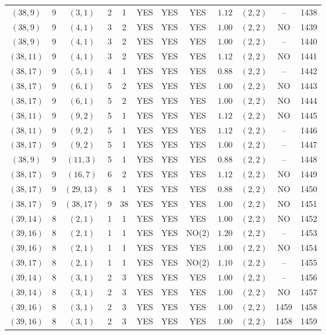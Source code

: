 \begin{longtable}{|c|c|c|c|c|c|c|c|c|c|c|c|}
$(38,9)$ & 9 & $(3,1)$ & 2 & 1 & YES & YES & YES & $1.12$ & $(2,2)$ & -- & 1438\\
$(38,9)$ & 9 & $(4,1)$ & 3 & 2 & YES & YES & YES & $1.00$ & $(2,2)$ & NO & 1439\\
$(38,9)$ & 9 & $(4,1)$ & 3 & 2 & YES & YES & YES & $1.00$ & $(2,2)$ & -- & 1440\\
$(38,11)$ & 9 & $(4,1)$ & 3 & 2 & YES & YES & YES & $1.12$ & $(2,2)$ & NO & 1441\\
$(38,17)$ & 9 & $(5,1)$ & 4 & 1 & YES & YES & YES & $0.88$ & $(2,2)$ & -- & 1442\\
$(38,17)$ & 9 & $(6,1)$ & 5 & 2 & YES & YES & YES & $1.00$ & $(2,2)$ & NO & 1443\\
$(38,17)$ & 9 & $(6,1)$ & 5 & 2 & YES & YES & YES & $1.00$ & $(2,2)$ & NO & 1444\\
$(38,11)$ & 9 & $(9,2)$ & 5 & 1 & YES & YES & YES & $1.12$ & $(2,2)$ & NO & 1445\\
$(38,11)$ & 9 & $(9,2)$ & 5 & 1 & YES & YES & YES & $1.12$ & $(2,2)$ & -- & 1446\\
$(38,17)$ & 9 & $(9,2)$ & 5 & 1 & YES & YES & YES & $1.00$ & $(2,2)$ & -- & 1447\\
$(38,9)$ & 9 & $(11,3)$ & 5 & 1 & YES & YES & YES & $0.88$ & $(2,2)$ & -- & 1448\\
$(38,17)$ & 9 & $(16,7)$ & 6 & 2 & YES & YES & YES & $1.12$ & $(2,2)$ & NO & 1449\\
$(38,17)$ & 9 & $(29,13)$ & 8 & 1 & YES & YES & YES & $0.88$ & $(2,2)$ & NO & 1450\\
$(38,17)$ & 9 & $(38,17)$ & 9 & 38 & YES & YES & YES & $1.00$ & $(2,2)$ & NO & 1451\\
$(39,14)$ & 8 & $(2,1)$ & 1 & 1 & YES & YES & YES & $1.00$ & $(2,2)$ & NO & 1452\\
$(39,16)$ & 8 & $(2,1)$ & 1 & 1 & YES & YES & NO(2) & $1.20$ & $(2,2)$ & -- & 1453\\
$(39,16)$ & 8 & $(2,1)$ & 1 & 1 & YES & YES & YES & $1.00$ & $(2,2)$ & NO & 1454\\
$(39,17)$ & 8 & $(2,1)$ & 1 & 1 & YES & YES & NO(2) & $1.10$ & $(2,2)$ & -- & 1455\\
$(39,14)$ & 8 & $(3,1)$ & 2 & 3 & YES & YES & YES & $1.00$ & $(2,2)$ & -- & 1456\\
$(39,14)$ & 8 & $(3,1)$ & 2 & 3 & YES & YES & YES & $1.00$ & $(2,2)$ & NO & 1457\\
$(39,16)$ & 8 & $(3,1)$ & 2 & 3 & YES & YES & YES & $1.00$ & $(2,2)$ & 1459 & 1458\\
$(39,16)$ & 8 & $(3,1)$ & 2 & 3 & YES & YES & YES & $1.00$ & $(2,2)$ & 1458 & 1459\\

\end{longtable}
